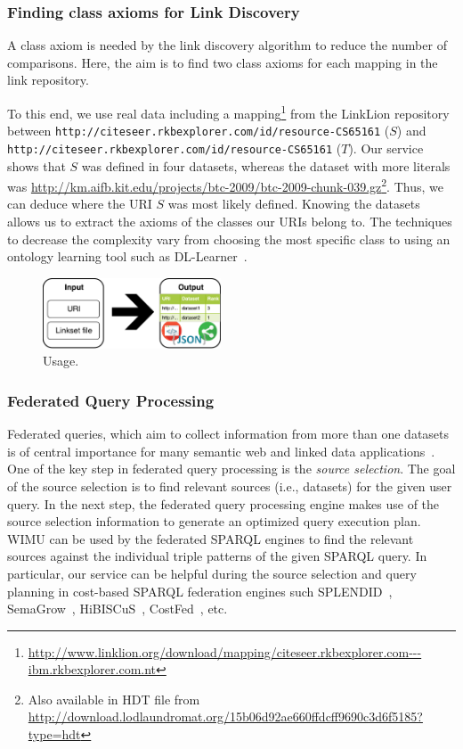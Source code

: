 \subsubsection{Finding class axioms for Link Discovery}
 A class axiom is needed by the link discovery algorithm to reduce the number of comparisons. 
 Here, the aim is to find two class axioms for each mapping in the link repository.

 To this end, we use real data including a mapping\footnote{\url{http://www.linklion.org/download/mapping/citeseer.rkbexplorer.com---ibm.rkbexplorer.com.nt}} from the Link\-Lion repository~\cite{linklion2014} between \texttt{http://citeseer.rkbexplorer.com/id/resource-CS65161} ($S$) and \texttt{http://citeseer.rkbexplorer.com/id/resource-CS65161} ($T$). 
 Our service shows that $S$ was defined in four datasets, whereas the dataset with more literals was \url{http://km.aifb.kit.edu/projects/btc-2009/btc-2009-chunk-039.gz}\footnote{Also available in HDT file from \url{http://download.lodlaundromat.org/15b06d92ae660ffdcff9690c3d6f5185?type=hdt}}. 
 Thus, we can deduce where the URI $S$ was most likely defined.
 Knowing the datasets allows us to extract the axioms of the classes our URIs belong to.
 The techniques to decrease the complexity vary from choosing the most specific class to using an ontology learning tool such as DL-Learner~\cite{lehmann2009dl}.

 \begin{figure}[htb] 
 	\centering
 	\includegraphics[width=150pt]{img/usage.pdf}
 	\caption{Usage.}
 	\label{fig:usage}
 \end{figure}

\subsubsection{Federated Query Processing}
 Federated queries, which aim to collect information from more than one datasets is of central importance for many semantic web and linked data applications~\cite{saleem2013fostering,bigtcga2014}. One of the key step in federated query processing is the \emph{source selection}. The goal of the source selection is to find relevant sources (i.e., datasets) for the given user query. In the next step, the federated query processing engine makes use of the source selection information to generate an optimized query execution plan. WIMU can be used by the federated SPARQL engines to find the relevant sources against the individual triple patterns of the given SPARQL query. In particular, our service can be helpful during the source selection and query planning in cost-based SPARQL federation engines such SPLENDID~\cite{splendid2011}, SemaGrow~\cite{semagrow2015}, HiBISCuS~\cite{hibiscus2014}, CostFed~\cite{costfed2017}, etc. 

